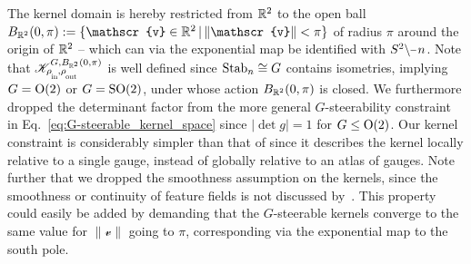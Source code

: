 The kernel domain is hereby restricted from $\mathbb{R}^2$ to the open ball $B_{\R^2}(0,\pi) := \{ \mathscr{v}\in\R^2 \,|\, \lVert \mathscr{v}\rVert < \pi \}$ of radius $\pi$ around the origin of $\mathbb{R}^2$ -- which can via the exponential map be identified with $S^2\backslash \mkern-1mu\minus\mkern1mu n$.
Note that $\mathscr{K}^{G,B_{\R^2}(0,\pi)}_{\rhoin\mkern-1mu,\rhoout}$ is well defined since $\operatorname{Stab}_{n} \cong G$ contains isometries, implying $G=\operatorname{O}(2)$ or $G=\operatorname{SO}(2)$, under whose action $B_{\mathbb{R}^2}(0,\pi)$ is closed.
We furthermore dropped the determinant factor from the more general $G$-steerability constraint in Eq.~\eqref{eq:G-steerable_kernel_space} since ${|\!\det g| = 1}$ for $G\leq\operatorname{O}(2)$.
Our kernel constraint is considerably simpler than that of \citet{Cohen2019-generaltheory} since it describes the kernel locally relative to a single gauge, instead of globally relative to an atlas of gauges.
Note further that we dropped the smoothness assumption on the kernels, since the smoothness or continuity of feature fields is not discussed by~\citet{Cohen2019-generaltheory}.
This property could easily be added by demanding that the $G$-steerable kernels converge to the same value for $\lVert\mathscr{v}\rVert$ going to $\pi$, corresponding via the exponential map to the south pole.

